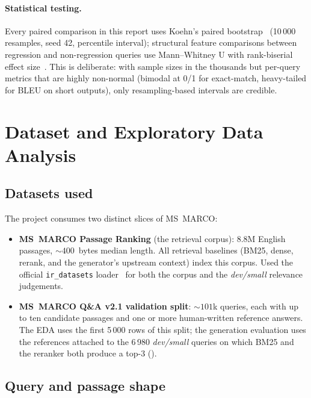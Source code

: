\documentclass[11pt,a4paper]{article}
\newcommand{\devsmall}{\textit{dev/small}}
\newcommand{\fdev}{6\,980}
\newcommand{\msmarco}{MS~MARCO}
\newcommand{\bmtwofive}{BM25}
\begin{document}
\paragraph{Statistical testing.}  Every paired comparison in this
report uses Koehn's paired bootstrap~\cite{koehn2004bootstrap}
(10\,000 resamples, seed 42, percentile interval); structural
feature comparisons between regression and non-regression queries
use Mann--Whitney U with rank-biserial effect
size~\cite{mannwhitney1947}.  This is deliberate: with sample sizes
in the thousands but per-query metrics that are highly non-normal
(bimodal at 0/1 for exact-match, heavy-tailed for BLEU on short
outputs), only resampling-based intervals are credible.

\clearpage\section{Dataset and Exploratory Data Analysis}
\label{sec:dataset}

\subsection{Datasets used}

The project consumes two distinct slices of \msmarco{}:

\begin{itemize}
  \item \textbf{\msmarco{} Passage Ranking} (the retrieval corpus): 8.8M
        English passages, $\sim\!400$~bytes median length.  All
        retrieval baselines (\bmtwofive{}, dense, rerank, and
        the generator's upstream context) index this corpus.  Used
        the official \texttt{ir\_datasets}
        loader~\cite{macavaney2021irdatasets} for both the corpus and
        the \devsmall{} relevance judgements.
  \item \textbf{\msmarco{} Q\&A v2.1 validation split}: $\sim\!101$k
        queries, each with up to ten candidate passages and one or
        more human-written reference answers.  The EDA uses the
        first 5\,000 rows of this split; the generation evaluation
        uses the references attached to the \fdev{} \devsmall{}
        queries on which \bmtwofive{} and the reranker both produce a
        top-3 ().
\end{itemize}

\subsection{Query and passage shape}
\end{document}
